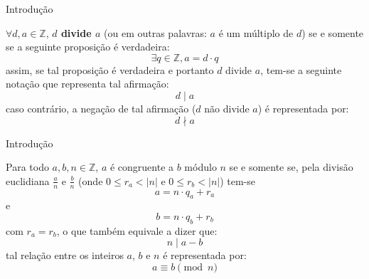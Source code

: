 \begin{frame}{Introdução}
    \begin{definicao}
            $\forall d, a \in \mathbb{Z}$, \textbf{$d$ divide $a$} (ou em outras palavras: $a$ é um múltiplo de $d$) se e somente se a seguinte proposição é verdadeira:
            \begin{equation*}
                \exists q \in \mathbb{Z}, a = d \cdot q
            \end{equation*}
            assim, se tal proposição é verdadeira e portanto $d$ divide $a$, tem-se a seguinte notação que representa tal afirmação:
            \begin{equation*}
                d \mid a
            \end{equation*}
            caso contrário, a negação de tal afirmação ($d$ não divide $a$) é representada por:
            \begin{equation*}
                d \nmid a
            \end{equation*}
    \end{definicao}
\end{frame}

\begin{frame}{Introdução}
    \begin{definicao}
        Para todo $a, b, n \in \mathbb{Z}$, $a$ é congruente a $b$ módulo $n$ se e somente se, pela divisão euclidiana $\frac{a}{n}$ e $\frac{b}{n}$ (onde $0 \leq r_{a} < |n|$ e $0 \leq r_b < |n|$) tem-se
        \begin{equation*}
            a = n \cdot q_a + r_a
        \end{equation*}
        e
        \begin{equation*}
            b = n \cdot q_b + r_b
        \end{equation*}
        com $r_a = r_b$, o que também equivale a dizer que:
        \begin{equation*}
            n \mid a - b
        \end{equation*}
        tal relação entre os inteiros $a$, $b$ e $n$ é representada por:
        \begin{equation*}
            a \equiv b \pmod{n}
        \end{equation*}
    \end{definicao}
\end{frame}

